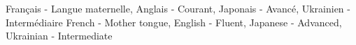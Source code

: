 
\fi


\vspace{\ItemsSpacing}

\ifnativelang
{}
{Fran\c cais - \textmd{Langue maternelle,} Anglais - \textmd{Courant,} Japonais - \textmd{Avanc\'e,} Ukrainien - \textmd{Interm\'ediaire}}{}{}{}{}
\else
{}
{French - \textmd{Mother tongue,} English - \textmd{Fluent,} Japanese - \textmd{Advanced,} Ukrainian - \textmd{Intermediate}}{}{}{}{}
\fi









